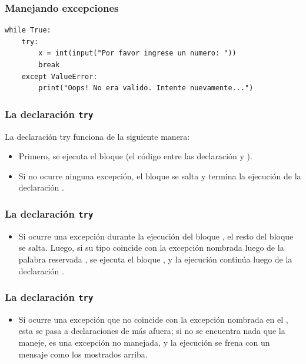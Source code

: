 \begin{frame}[fragile]
\frametitle{Manejando excepciones}
\begin{lstlisting}[basicstyle=\linespread{1.2}\ttfamily\small, columns=fullflexible,escapeinside=||]
while True:
	try:
		x = int(input("Por favor ingrese un numero: "))
		break
	except ValueError:
		print("Oops! No era valido. Intente nuevamente...")
\end{lstlisting}
\end{frame}
\begin{frame}
\frametitle{La declaración \texttt{try}}
La declaración try funciona de la siguiente manera:
\begin{itemize}[<+->]
\item Primero, se ejecuta el bloque  (el código entre las declaración  y ).
\item  Si no ocurre ninguna excepción, el bloque  se salta y termina la ejecución de la declaración .
\end{itemize}
\end{frame}
\begin{frame}
\frametitle{La declaración \texttt{try}}
\begin{itemize}[<+->]
\item  Si ocurre una excepción durante la ejecución del bloque , el resto del bloque se salta. Luego, si su tipo coincide con la excepción nombrada luego de la palabra reservada , se ejecuta el bloque , y la ejecución continúa luego de la declaración .
\end{itemize}
\end{frame}
\begin{frame}
\frametitle{La declaración \texttt{try}}
\begin{itemize}[<+->]
\item Si ocurre una excepción que no coincide con la excepción nombrada en el , esta se pasa a declaraciones  de más afuera; si no se encuentra nada que la maneje, es una excepción no manejada, y la ejecución se frena con un mensaje como los mostrados arriba.
\end{itemize}
\end{frame}
